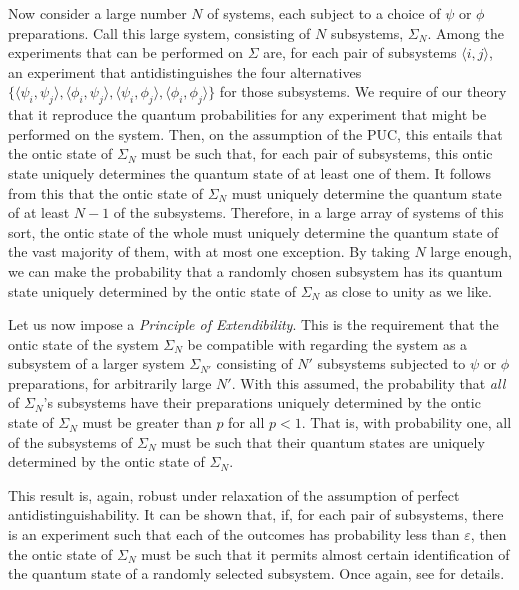\documentclass[12pt]{article}
\begin{document}
Now consider  a large number $N$ of systems, each subject to a choice of $\psi$ or $\phi$ preparations.  Call this large system, consisting of $N$ subsystems, $\Sigma_N$.  Among the experiments that can be performed on $\Sigma$ are, for each pair of subsystems $\langle i, j \rangle$, an experiment that antidistinguishes the four alternatives  $\{ \langle \psi_i, \psi_j \rangle, \langle \phi_i, \psi_j \rangle, \langle \psi_i, \phi_j \rangle, \langle \phi_i, \phi_j \rangle \}$ for those subsystems.  We require of our theory that it reproduce the quantum probabilities for any experiment that might be performed on the system.  Then, on the assumption of the PUC, this entails that the ontic state of  $\Sigma_N$ must be such that, for each pair of subsystems, this ontic state  uniquely determines the quantum state  of at least one of them.  It follows from this that the ontic state of $\Sigma_N$ must uniquely determine the quantum state of at least $N - 1$ of the subsystems. Therefore, in a large array of systems of this sort, the ontic state of the whole must uniquely determine the quantum state of the vast majority of them, with at most one exception.   By taking $N$  large enough, we can make the probability that a randomly chosen subsystem has its quantum state uniquely determined by the ontic state of $\Sigma_N$ as close to unity as we like.

Let us now impose  a \emph{Principle of Extendibility}.  This is the  requirement that the ontic state of the system $\Sigma_N$  be compatible with regarding the system as a subsystem of a larger system  $\Sigma_{N'}$ consisting of $N'$ subsystems subjected to $\psi$ or $\phi$ preparations, for arbitrarily large $N'$.  With this assumed, the probability that \emph{all} of $\Sigma_N$'s subsystems have their preparations uniquely determined by the ontic state of $\Sigma_N$ must be greater than $p$ for all $p < 1$.  That is, with probability one, all of the subsystems of  $\Sigma_N$ must be such that their quantum states are uniquely determined by the ontic state of $\Sigma_N$.

This result is, again, robust under relaxation of the assumption of perfect antidistinguishability.  It can be shown that, if, for each pair of subsystems, there is an experiment such that each of the outcomes has probability less than $\varepsilon$, then the ontic state of $\Sigma_N$ must be such that it permits almost certain identification of the quantum state of a randomly selected subsystem. Once again, see \citet{MyrvoldPsiOnt} for details.
\end{document}
